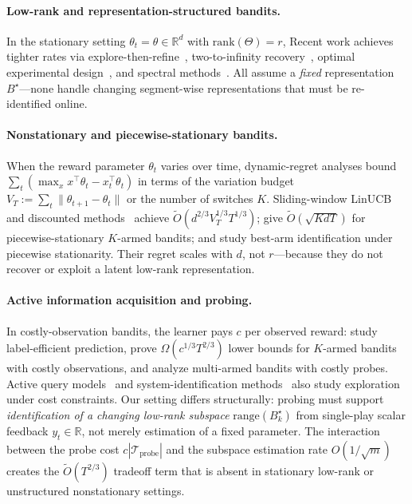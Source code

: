 \documentclass{article}
\newcommand{\R}{\mathbb{R}}
\newcommand{\cTprobe}{\mathcal{T}_{\mathrm{probe}}}
\newcommand{\rank}{\mathrm{rank}}
\newcommand{\range}{\mathrm{range}}
\begin{document}
\paragraph{Low-rank and representation-structured bandits.}
In the stationary setting $\theta_t = \theta \in \R^d$ with $\rank(\Theta) = r$,
Recent work achieves tighter rates via explore-then-refine~\citep{kang2022gestt}, two-to-infinity recovery~\citep{pmlr-v235-jedra24a}, optimal experimental design~\citep{pmlr-v235-jang24e}, and spectral methods~\citep{stojanovic2023spectral}. All assume a \emph{fixed} representation $B^\star$---none handle changing segment-wise representations that must be re-identified online.

\paragraph{Nonstationary and piecewise-stationary bandits.}
When the reward parameter $\theta_t$ varies over time, dynamic-regret analyses bound
$\sum_t (\max_x x^\top\theta_t - x_t^\top\theta_t)$ in terms of the variation budget $V_T := \sum_t \|\theta_{t+1} - \theta_t\|$ or the number of switches $K$.
Sliding-window LinUCB~\citep{russac2019weighted} and discounted methods~\citep{cheung2019learning} achieve $\widetilde O(d^{2/3}V_T^{1/3}T^{1/3})$; \citet{abbasi2023dynamic} give $\widetilde O(\sqrt{KdT})$ for piecewise-stationary $K$-armed bandits; and \citet{hou2024pslb} study best-arm identification under piecewise stationarity. Their regret scales with $d$, not $r$---because they do not recover or exploit a latent low-rank representation.

\paragraph{Active information acquisition and probing.}
In costly-observation bandits, the learner pays $c$ per observed reward:
\citet{seldin2014paid} study label-efficient prediction, \citet{tucker2023costly} prove $\Omega(c^{1/3}T^{2/3})$ lower bounds for $K$-armed bandits with costly observations, and \citet{elumar2025costly} analyze multi-armed bandits with costly probes.
Active query models~\citep{sekhari2023contextual} and system-identification methods~\citep{memmel2024asid} also study exploration under cost constraints.
Our setting differs structurally: probing must support \emph{identification of a changing low-rank subspace} $\range(B_k^\star)$ from single-play scalar feedback $y_t \in \R$, not merely estimation of a fixed parameter.
The interaction between the probe cost $c|\cTprobe|$ and the subspace estimation rate $O(1/\sqrt{m})$ creates the $\widetilde O(T^{2/3})$ tradeoff term that is absent in stationary low-rank or unstructured nonstationary settings.
\end{document}
